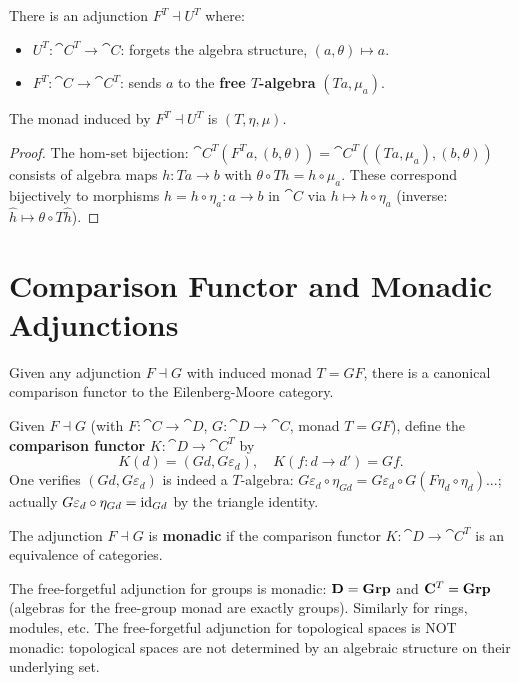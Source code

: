 \begin{proposition}
There is an adjunction $F^T \dashv U^T$ where:
\begin{itemize}
  \item $U^T: \cat{C}^T \to \cat{C}$: forgets the algebra structure, $(a,\theta) \mapsto a$.
  \item $F^T: \cat{C} \to \cat{C}^T$: sends $a$ to the \textbf{free $T$-algebra} $(Ta, \mu_a)$.
\end{itemize}
The monad induced by $F^T \dashv U^T$ is $(T, \eta, \mu)$.
\end{proposition}

\begin{proof}
The hom-set bijection: $\cat{C}^T(F^T a, (b, \theta)) = \cat{C}^T((Ta, \mu_a), (b, \theta))$ consists of algebra maps $h: Ta \to b$ with $\theta \circ Th = h \circ \mu_a$. These correspond bijectively to morphisms $\hat{h} = h \circ \eta_a: a \to b$ in $\cat{C}$ via $h \mapsto h \circ \eta_a$ (inverse: $\hat{h} \mapsto \theta \circ T\hat{h}$).
\end{proof}

\section{Comparison Functor and Monadic Adjunctions}

Given any adjunction $F \dashv G$ with induced monad $T = GF$, there is a canonical comparison functor to the Eilenberg-Moore category.

\begin{definition}
Given $F \dashv G$ (with $F: \cat{C} \to \cat{D}$, $G: \cat{D} \to \cat{C}$, monad $T = GF$), define the \textbf{comparison functor} $K: \cat{D} \to \cat{C}^T$ by
\[
  K(d) = (Gd, G\varepsilon_d), \quad K(f: d \to d') = Gf.
\]
One verifies $(Gd, G\varepsilon_d)$ is indeed a $T$-algebra: $G\varepsilon_d \circ \eta_{Gd} = G\varepsilon_d \circ G(F\eta_d \circ \eta_d)... $; actually $G\varepsilon_d \circ \eta_{Gd} = \mathrm{id}_{Gd}$ by the triangle identity.
\end{definition}

\begin{definition}
The adjunction $F \dashv G$ is \textbf{monadic} if the comparison functor $K: \cat{D} \to \cat{C}^T$ is an equivalence of categories.
\end{definition}

\begin{example}
The free-forgetful adjunction for groups is monadic: $\mathbf{D} = \mathbf{Grp}$ and $\mathbf{C}^T = \mathbf{Grp}$ (algebras for the free-group monad are exactly groups). Similarly for rings, modules, etc. The free-forgetful adjunction for topological spaces is NOT monadic: topological spaces are not determined by an algebraic structure on their underlying set.
\end{example}

